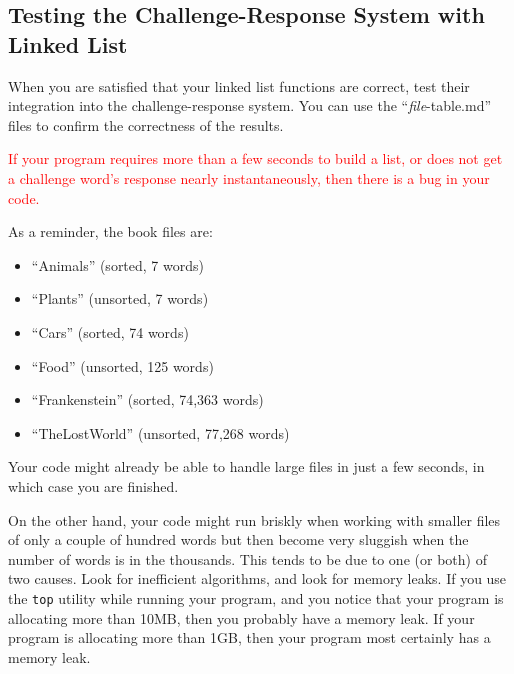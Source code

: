 \subsection{Testing the Challenge-Response System with Linked List}

When you are satisfied that your linked list functions are correct, test their integration into the challenge-response system.
You can use the ``\textit{file}-table.md'' files to confirm the correctness of the results.

\textcolor{red}{If your program requires more than a few seconds to build a list, or does not get a challenge word's response nearly instantaneously, then there is a bug in your code.}

\begin{description}
\end{description}

As a reminder, the book files are:

\begin{itemize}
    \item ``Animals'' (sorted, 7 words)
    \item ``Plants'' (unsorted, 7 words)
    \item ``Cars'' (sorted, 74 words)
    \item ``Food'' (unsorted, 125 words)
    \item ``Frankenstein'' (sorted, 74,363 words)
    \item ``TheLostWorld'' (unsorted, 77,268 words)
\end{itemize}

Your code might already be able to handle large files in just a few seconds, in which case you are finished.

On the other hand, your code might run briskly when working with smaller files of only a couple of hundred words but then become very sluggish when the number of words is in the thousands.
This tends to be due to one (or both) of two causes.
Look for inefficient algorithms, and look for memory leaks.
If you use the \texttt{top} utility while running your program, and you notice that your program is allocating more than 10MB, then you probably have a memory leak.
If your program is allocating more than 1GB, then your program most certainly has a memory leak.
